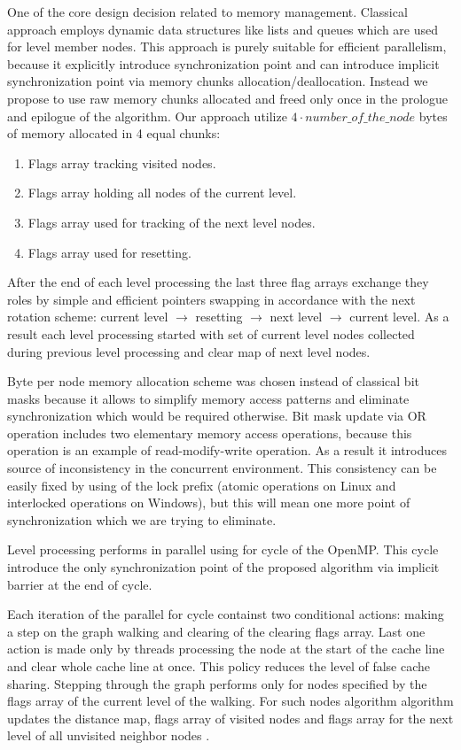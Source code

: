 \documentclass[letterpaper]{article}
\begin{document}
			One of the core design decision related to memory management.
			Classical approach employs dynamic data structures like lists and queues which are used for level member nodes.
			This approach is purely suitable for efficient parallelism, because it explicitly introduce synchronization point and can introduce implicit synchronization point via memory chunks allocation/deallocation. 
			Instead we propose to use raw memory chunks allocated and freed only once in the prologue and epilogue of the algorithm.
			Our approach utilize $4 \cdot number\_of\_the\_node$ bytes of memory allocated in 4 equal chunks:
			\begin{enumerate}
				\item Flags array tracking visited nodes.
				\item Flags array holding all nodes of the current level.
				\item Flags array used for tracking of the next level nodes.
				\item Flags array used for resetting.
			\end{enumerate}
			
			After the end of each level processing the last three flag arrays exchange they roles by simple and efficient pointers swapping in accordance with the next rotation scheme: current level $\to$ resetting $\to$ next level $\to$ current level.
			As a result each level processing started with set of current level nodes collected during previous level processing and clear map of next level nodes. 

			Byte per node memory allocation scheme was chosen instead of classical bit masks because it allows to simplify memory access patterns and eliminate synchronization which would be required otherwise.
			Bit mask update via OR operation includes two elementary memory access operations, because this operation is an example of read-modify-write operation.
			As a result it introduces source of inconsistency in the concurrent environment.
			This consistency can be easily fixed by using of the lock prefix (atomic operations on Linux and interlocked operations on Windows), but this will mean one more point of synchronization which we are trying to eliminate.
			
			Level processing performs in parallel using for cycle of the OpenMP.
			This cycle introduce the only synchronization point of the proposed algorithm via implicit barrier at the end of cycle.
			
			Each iteration of the parallel for cycle containst two conditional actions: making a step on the graph walking and clearing of the clearing flags array.
			Last one action is made only by threads processing the node at the start of the cache line and clear whole cache line at once.
			This policy reduces the level of false cache sharing. 
			Stepping through the graph performs only for nodes specified by the flags array of the current level of the walking.
			For such nodes algorithm algorithm updates the distance map, flags array of visited nodes and flags array for the next level of all unvisited neighbor nodes .
						
\end{document}
